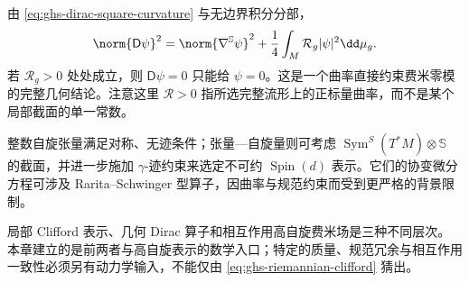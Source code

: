 由 \cref{eq:ghs-dirac-square-curvature} 与无边界积分分部，
\[
 \norm{\mathsf D\psi}^2=\norm{\nabla^{\mathbb S}\psi}^2
 +\frac14\int_M\mathcal R_g|\psi|^2\dd\mu_g.
\]
若 $\mathcal R_g>0$ 处处成立，则 $\mathsf D\psi=0$ 只能给 $\psi=0$。这是一个曲率直接约束费米零模的完整几何结论。注意这里 $\mathcal R>0$ 指所选完整流形上的正标量曲率，而不是某个局部截面的单一常数。

整数自旋张量满足对称、无迹条件；张量—自旋量则可考虑 $\operatorname{Sym}^S(T^*M)\otimes\mathbb S$ 的截面，并进一步施加 $\gamma$-迹约束来选定不可约 $\operatorname{Spin}(d)$ 表示。它们的协变微分方程可涉及 Rarita--Schwinger 型算子，因曲率与规范约束而受到更严格的背景限制。

局部 Clifford 表示、几何 Dirac 算子和相互作用高自旋费米场是三种不同层次。本章建立的是前两者与高自旋表示的数学入口；特定的质量、规范冗余与相互作用一致性必须另有动力学输入，不能仅由 \cref{eq:ghs-riemannian-clifford} 猜出。
